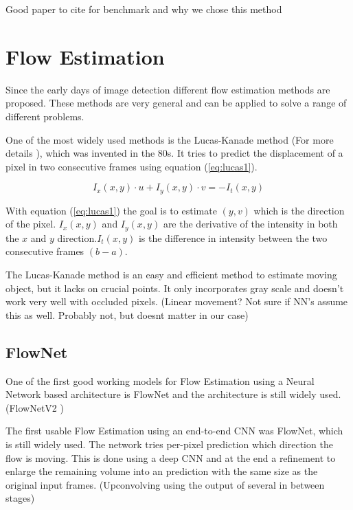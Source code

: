 Good paper to cite for benchmark and why we chose this method
\cite{wang2020nwpu}
\cite{li2018csrnet}



\section{Flow Estimation}
Since the early days of image detection different flow estimation methods are proposed. These methods are very general and can be applied to solve a range of different problems.

One of the most widely used methods is the Lucas-Kanade method (For more details \cite{lucas_kan_nutshell}), which was invented in the 80s. It tries to predict the displacement of a pixel in two consecutive frames using equation (\ref{eq:lucas1}).

\begin{equation} \label{eq:lucas1}
I_x(x, y) \cdot u + I_y(x,y) \cdot v = -I_t(x,y)
\end{equation}

With equation (\ref{eq:lucas1}) the goal is to estimate $(y, v)$ which is the direction of the pixel. $I_x(x, y)$ and $I_y(x, y)$ are the derivative of the intensity in both the $x$ and $y$ direction.$I_t(x, y)$ is the difference in intensity between the two consecutive frames $(b-a)$.

The Lucas-Kanade method is an easy and efficient method to estimate moving object, but it lacks on crucial points. It only incorporates gray scale and doesn't work very well with occluded pixels. (Linear movement? Not sure if NN's assume this as well. Probably not, but doesnt matter in our case)

\subsection{FlowNet}
One of the first good working models for Flow Estimation using a Neural Network based architecture is FlowNet \cite{fischer_flownet_2015} and the architecture is still widely used. (FlowNetV2 \cite{ilg_flownet_2016})

The first usable Flow Estimation using an end-to-end CNN was FlowNet, which is still widely used. The network tries per-pixel prediction which direction the flow is moving. This is done using a deep CNN and at the end a refinement to enlarge the remaining volume into an prediction with the same size as the original input frames. (Upconvolving using the output of several in between stages)

